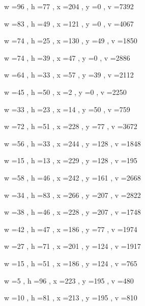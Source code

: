 \documentclass[11pt]{article}
\begin{document}
w =96 , h =77 , x =204 , y =0 , v =7392
\par
w =83 , h =49 , x =121 , y =0 , v =4067
\par
w =74 , h =25 , x =130 , y =49 , v =1850
\par
w =74 , h =39 , x =47 , y =0 , v =2886
\par
w =64 , h =33 , x =57 , y =39 , v =2112
\par
w =45 , h =50 , x =2 , y =0 , v =2250
\par
w =33 , h =23 , x =14 , y =50 , v =759
\par
w =72 , h =51 , x =228 , y =77 , v =3672
\par
w =56 , h =33 , x =244 , y =128 , v =1848
\par
w =15 , h =13 , x =229 , y =128 , v =195
\par
w =58 , h =46 , x =242 , y =161 , v =2668
\par
w =34 , h =83 , x =266 , y =207 , v =2822
\par
w =38 , h =46 , x =228 , y =207 , v =1748
\par
w =42 , h =47 , x =186 , y =77 , v =1974
\par
w =27 , h =71 , x =201 , y =124 , v =1917
\par
w =15 , h =51 , x =186 , y =124 , v =765
\par
w =5 , h =96 , x =223 , y =195 , v =480
\par
w =10 , h =81 , x =213 , y =195 , v =810
\par
\newpage
\end{document}
